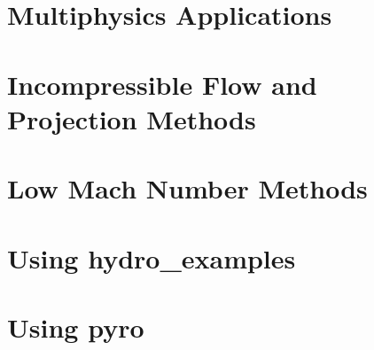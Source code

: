 \documentclass[11pt]{book}
\newcommand{\pyro}{{\sf pyro}}
\newcommand{\hydroex}{{\sf hydro\_examples}}
\begin{document}


\chapter{Multiphysics Applications}



\chapter{Incompressible Flow and Projection Methods}



\chapter{Low Mach Number Methods}



\appendix

\chapter{Using \hydroex}



\chapter{Using \pyro}





\backmatter




\end{document}
